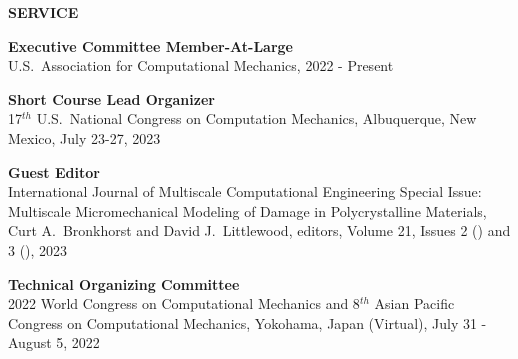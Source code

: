 
\vspace{\sectionskip}
\noindent
{\large \textbf{SERVICE}}
\vspace{\sectionskip}

\begin{minipage}{\minipagewidth}
\textbf{Executive Committee Member-At-Large}\\U.S.~Association for Computational Mechanics, 2022 - Present
\end{minipage}\vspace{\parskip}

\begin{minipage}{\minipagewidth}
\textbf{Short Course Lead Organizer}\\17$^{th}$ U.S.~National Congress on Computation Mechanics, Albuquerque, New Mexico, July 23-27, 2023
\end{minipage}\vspace{\parskip}

\begin{minipage}{\minipagewidth}
\textbf{Guest Editor}\\International Journal of Multiscale Computational Engineering Special Issue: Multiscale Micromechanical Modeling of Damage in Polycrystalline Materials, Curt A.~Bronkhorst and David J.~Littlewood, editors, Volume 21, Issues 2 () and 3 (), 2023
\end{minipage}\vspace{\parskip}

\begin{minipage}{\minipagewidth}
\textbf{Technical Organizing Committee}\\2022 World Congress on Computational Mechanics and 8$^{th}$ Asian Pacific Congress on Computational Mechanics, Yokohama, Japan (Virtual), July 31 - August 5, 2022
\end{minipage}\vspace{\parskip}
